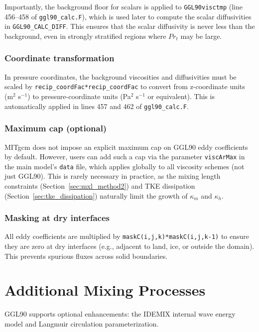 \documentclass[12pt,letterpaper]{article}
\begin{document}
Importantly, the background floor for scalars is applied to \verb|GGL90visctmp| (line 456--458 of \verb|ggl90_calc.F|), which is used later to compute the scalar diffusivities in \verb|GGL90_CALC_DIFF|. This ensures that the scalar diffusivity is never less than the background, even in strongly stratified regions where $Pr_t$ may be large.

\subsubsection{Coordinate transformation}

In pressure coordinates, the background viscosities and diffusivities must be scaled by \verb|recip_coordFac*recip_coordFac| to convert from z-coordinate units (m$^2$ s$^{-1}$) to pressure-coordinate units (Pa$^2$ s$^{-1}$ or equivalent). This is automatically applied in lines 457 and 462 of \verb|ggl90_calc.F|.

\subsubsection{Maximum cap (optional)}

MITgcm does not impose an explicit maximum cap on GGL90 eddy coefficients by default. However, users can add such a cap via the parameter \verb|viscArMax| in the main model's \verb|data| file, which applies globally to all viscosity schemes (not just GGL90). This is rarely necessary in practice, as the mixing length constraints (Section~\ref{sec:mxl_method2}) and TKE dissipation (Section~\ref{sec:tke_dissipation}) naturally limit the growth of $\kappa_m$ and $\kappa_h$.

\subsubsection{Masking at dry interfaces}

All eddy coefficients are multiplied by \verb|maskC(i,j,k)*maskC(i,j,k-1)| to ensure they are zero at dry interfaces (e.g., adjacent to land, ice, or outside the domain). This prevents spurious fluxes across solid boundaries.

\section{Additional Mixing Processes}
\label{sec:additional_processes}

GGL90 supports optional enhancements: the IDEMIX internal wave energy model and Langmuir circulation parameterization.
\end{document}
